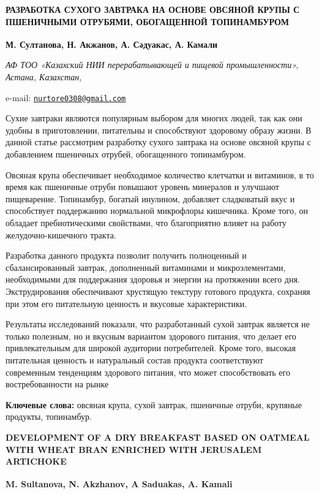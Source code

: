 \begin{articleheader}
{\bfseries РАЗРАБОТКА СУХОГО ЗАВТРАКА НА ОСНОВЕ ОВСЯНОЙ КРУПЫ С ПШЕНИЧНЫМИ ОТРУБЯМИ, ОБОГАЩЕННОЙ ТОПИНАМБУРОМ}

{\bfseries
М. Султанова,
Н. Акжанов\textsuperscript{\envelope },
А. Сәдуакас,
А. Камали}
\end{articleheader}

\begin{affiliation}
\emph{АФ ТОО «Казахский НИИ перерабатывающей и пищевой промышленности», Астана, Казахстан},

e-mail: \href{mailto:nurtore0308@gmail.com}{\nolinkurl{nurtore0308@gmail.com}}
\end{affiliation}

Сухие завтраки являются популярным выбором для многих людей, так как они
удобны в приготовлении, питательны и способствуют здоровому образу
жизни. В данной статье рассмотрим разработку сухого завтрака на основе
овсяной крупы с добавлением пшеничных отрубей, обогащенного
топинамбуром.

Овсяная крупа обеспечивает необходимое количество клетчатки и витаминов,
в то время как пшеничные отруби повышают уровень минералов и улучшают
пищеварение. Топинамбур, богатый инулином, добавляет сладковатый вкус и
способствует поддержанию нормальной микрофлоры кишечника. Кроме того, он
обладает пребиотическими свойствами, что благоприятно влияет на работу
желудочно-кишечного тракта.

Разработка данного продукта позволит получить полноценный и
сбалансированный завтрак, дополненный витаминами и микроэлементами,
необходимыми для поддержания здоровья и энергии на протяжении всего дня.
Экструдирования обеспечивают хрустящую текстуру готового продукта,
сохраняя при этом его питательную ценность и вкусовые характеристики.

Результаты исследований показали, что разработанный сухой завтрак
является не только полезным, но и вкусным вариантом здорового питания,
что делает его привлекательным для широкой аудитории потребителей. Кроме
того, высокая питательная ценность и натуральный состав продукта
соответствуют современным тенденциям здорового питания, что может
способствовать его востребованности на рынке

{\bfseries Ключевые слова:} овсяная крупа, сухой завтрак, пшеничные отруби,
крупяные продукты, топинамбур.

\begin{articleheader}
{\bfseries DEVELOPMENT OF A DRY BREAKFAST BASED ON OATMEAL WITH WHEAT BRAN ENRICHED WITH JERUSALEM ARTICHOKE}

{\bfseries
M. Sultanova,
N. Akzhanov\textsuperscript{\envelope },
A Saduakas,
A. Kamali}
\end{articleheader}

